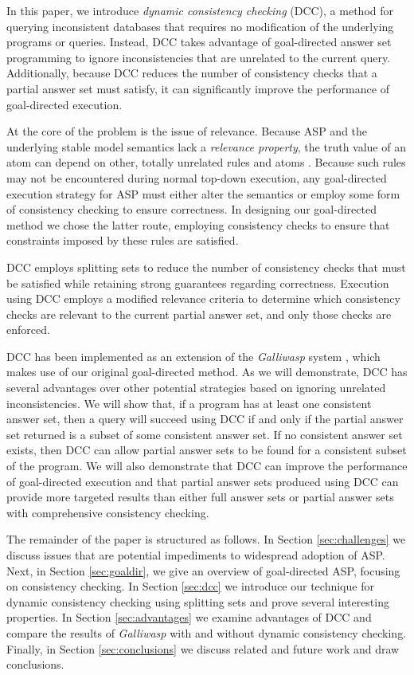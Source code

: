 \documentclass{new_tlp}
\begin{document}
In this paper, we introduce \textit{dynamic consistency checking} (DCC), a 
method for querying inconsistent databases that requires no modification of the
underlying programs or queries. Instead, DCC takes advantage of goal-directed
answer set programming to ignore inconsistencies that are unrelated to the
current query. Additionally, because DCC reduces the number of consistency
checks that a partial answer set must satisfy, it can significantly improve the
performance of goal-directed execution.

At the core of the problem is the issue of relevance. Because ASP and the
underlying stable model semantics lack a \textit{relevance property}, the
truth value of an atom can depend on other, totally unrelated rules and atoms
\cite{dix95}. Because such rules may not be encountered during normal top-down
execution, any goal-directed execution strategy for ASP must either alter the
semantics or employ some form of consistency checking to ensure correctness.
In designing our goal-directed method we chose the latter route, employing
consistency checks to ensure that constraints imposed by these rules are 
satisfied.

DCC employs splitting sets \cite{splitting} to reduce the number of 
consistency checks that must be satisfied while retaining strong guarantees 
regarding correctness. Execution using DCC employs a modified relevance 
criteria to determine which consistency checks are relevant to the current 
partial answer set, and only those checks are enforced.

DCC has been implemented as an extension of the \textit{Galliwasp} 
system \cite{galliwasp}, which makes use of our original goal-directed method.
As we will demonstrate, DCC has several advantages over other potential 
strategies based on ignoring unrelated inconsistencies. We will show that, if a
program has at least one consistent answer set, then a query will succeed using
DCC if and only if the partial answer set returned is a subset of some
consistent answer set. If no consistent answer set exists, then DCC can allow
partial answer sets to be found for a consistent subset of the program. We will
also demonstrate that DCC can improve the performance of goal-directed 
execution and that partial answer sets produced using DCC can provide more
targeted results than either full answer sets or partial answer sets with 
comprehensive consistency checking. 

The remainder of the paper is structured as follows.
In Section \ref{sec:challenges} we discuss issues that are potential 
impediments to widespread adoption of ASP. Next, in Section \ref{sec:goaldir},
we give an overview of goal-directed ASP, focusing on consistency checking. In
Section \ref{sec:dcc} we introduce our technique for dynamic consistency
checking using splitting sets and prove several interesting properties. In
Section \ref{sec:advantages} we examine advantages of DCC and compare the
results of \textit{Galliwasp} with and without dynamic consistency checking. 
Finally, in Section \ref{sec:conclusions} we discuss related and future work 
and draw conclusions.
\end{document}
